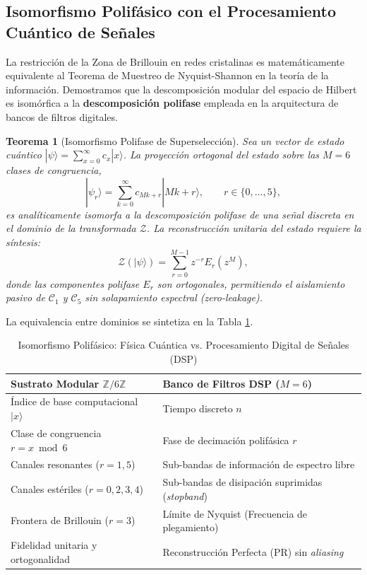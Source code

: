 \documentclass[12pt,a4paper]{article}
\theoremstyle{plain}
\newtheorem{teorema}{Teorema}[section]
\theoremstyle{definition}
\theoremstyle{remark}
\begin{document}
\subsection{Isomorfismo Polifásico con el Procesamiento Cuántico de Señales}

La restricción de la Zona de Brillouin en redes cristalinas es matemáticamente equivalente al Teorema de Muestreo de Nyquist-Shannon en la teoría de la información. Demostramos que la descomposición modular del espacio de Hilbert es isomórfica a la \textbf{descomposición polifase} empleada en la arquitectura de bancos de filtros digitales.

\begin{teorema}[Isomorfismo Polifase de Superselección]
Sea un vector de estado cuántico $|\psi\rangle = \sum_{x=0}^{\infty} c_x |x\rangle$. La proyección ortogonal del estado sobre las $M=6$ clases de congruencia,
\begin{equation}
|\psi_r\rangle = \sum_{k=0}^{\infty} c_{Mk + r} |Mk+r\rangle, \qquad r \in \{0,\dots,5\},
\end{equation}
es analíticamente isomorfa a la descomposición polifase de una señal discreta en el dominio de la transformada $\mathcal{Z}$. La reconstrucción unitaria del estado requiere la síntesis:
\begin{equation}
\mathcal{Z}(|\psi\rangle) = \sum_{r=0}^{M-1} z^{-r} E_r(z^M),
\end{equation}
donde las componentes polifase $E_r$ son ortogonales, permitiendo el aislamiento pasivo de $\mathcal{C}_1$ y $\mathcal{C}_5$ sin solapamiento espectral (\textit{zero-leakage}).
\end{teorema}

La equivalencia entre dominios se sintetiza en la Tabla \ref{tab:isomorfismo}.

\begin{table}[H]
\centering
\caption{Isomorfismo Polifásico: Física Cuántica vs. Procesamiento Digital de Señales (DSP)}
\label{tab:isomorfismo}
\begin{tabular}{ll}
\toprule
\textbf{Sustrato Modular $\mathbb{Z}/6\mathbb{Z}$} & \textbf{Banco de Filtros DSP ($M=6$)} \\
\midrule
Índice de base computacional $|x\rangle$ & Tiempo discreto $n$ \\
Clase de congruencia $r = x \bmod 6$ & Fase de decimación polifásica $r$ \\
Canales resonantes ($r=1,5$) & Sub-bandas de información de espectro libre \\
Canales estériles ($r=0,2,3,4$) & Sub-bandas de disipación suprimidas (\textit{stopband}) \\
Frontera de Brillouin ($r=3$) & Límite de Nyquist (Frecuencia de plegamiento) \\
Fidelidad unitaria y ortogonalidad & Reconstrucción Perfecta (PR) sin \textit{aliasing} \\
\bottomrule
\end{tabular}
\end{table}
\end{document}
